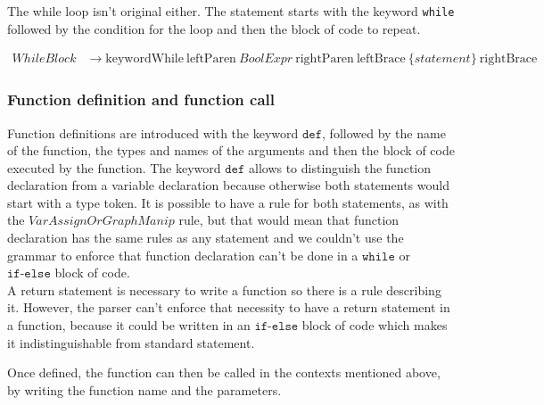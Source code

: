 The while loop isn't original either.
The statement starts with the keyword \texttt{while} followed by the condition for the loop and then the block of code to repeat.

\begin{align*}
\mathit{WhileBlock} &\rightarrow \text{keywordWhile} \: \text{leftParen} \: \mathit{BoolExpr} \: \text{rightParen} \: \text{leftBrace} \: \{ \mathit{statement}\} \: \text{rightBrace}
\end{align*}

\subsubsection*{Function definition and function call}

Function definitions are introduced with the keyword $\texttt{def}$, followed by the name of the function, the types and names of the arguments and then the block of code executed by the function.
The keyword $\texttt{def}$ allows to distinguish the function declaration from a variable declaration because otherwise both statements would start with a type token.
It is possible to have a rule for both statements, as with the $\mathit{VarAssignOrGraphManip}$ rule, but that would mean that function declaration has the same rules as any statement and we couldn't use the grammar to enforce that function declaration can't be done in a $\texttt{while}$ or $\texttt{if-else}$ block of code.\\

A return statement is necessary to write a function so there is a rule describing it.
However, the parser can't enforce that necessity to have a return statement in a function, because it could be written in an $\texttt{if-else}$ block of code which makes it indistinguishable from standard statement.

Once defined, the function can then be called in the contexts mentioned above, by writing the function name and the parameters.

